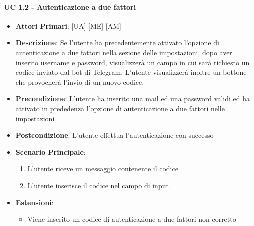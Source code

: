 			\paragraph{UC 1.2 - Autenticazione a due fattori}
			\begin{itemize}
				\item \textbf{Attori Primari}: [UA] [ME] [AM]
				\item \textbf{Descrizione}: Se l'utente ha precedentemente attivato l'opzione di autenticazione a due fattori nella sezione delle impostazioni, dopo aver inserito username e password, visualizzerà un campo in cui sarà richiesto un codice inviato dal bot di Telegram. L'utente visualizzerà inoltre un bottone che provocherà l'invio di un nuovo codice.
				\item \textbf{Precondizione}: L'utente ha inserito una mail ed una password validi ed ha attivato in prededenza l'opzione di autenticazione a due fattori nelle impostazioni
				\item \textbf{Postcondizione}: L'utente effettua l'autenticazione con successo
				\item \textbf{Scenario Principale}:
				\begin{enumerate}
					\item{L'utente riceve un messaggio contenente il codice}
					\item{L'utente inserisce il codice nel campo di input}
				\end{enumerate}	
				\item \textbf{Estensioni}:
					\begin{itemize}
						\item Viene inserito un codice di autenticazione a due fattori non corretto
					\end{itemize}
			\end{itemize}

